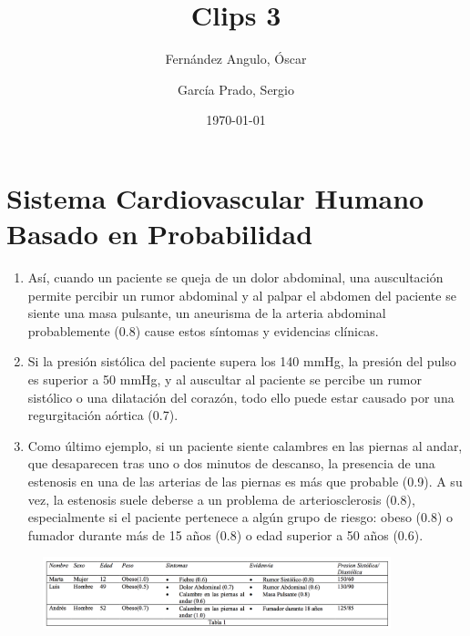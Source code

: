 \documentclass[10pt, a4paper,spanish]{article}
\title{\vspace{-15mm}\fontsize{24pt}{10pt}\selectfont\textbf{Clips 3}} %
\author{
	Fernández Angulo, Óscar \\
	\and
	García Prado, Sergio
}
\date{\today}
\begin{document}
	\maketitle %

	\thispagestyle{fancy} %



	\section{Sistema Cardiovascular Humano Basado en Probabilidad}

		\begin{enumerate}

			\item Así, cuando un paciente se queja de un dolor abdominal, una auscultación permite percibir un rumor abdominal y al palpar el abdomen del paciente se siente una masa pulsante, un aneurisma de la arteria abdominal probablemente (0.8) cause estos síntomas y evidencias clínicas.

			\item Si la presión sistólica del paciente supera los 140 mmHg, la presión del pulso es superior a 50 mmHg, y al auscultar al paciente se percibe un rumor sistólico o una dilatación del corazón, todo ello puede estar causado por una regurgitación aórtica (0.7).

			\item Como último ejemplo, si un paciente siente calambres en las piernas al andar, que desaparecen tras uno o dos minutos de descanso, la presencia de una estenosis en una de las arterias de las piernas es más que probable (0.9). A su vez, la estenosis suele deberse a un problema de arteriosclerosis (0.8), especialmente si el paciente pertenece a algún grupo de riesgo: obeso (0.8) o fumador durante más de 15 años (0.8) o edad superior a 50 años (0.6).

		\end{enumerate}

		\begin{figure}[H]
			\begin{center}
				\includegraphics[width=0.9\textwidth]{table-1}
			\end{center}
		\end{figure}
\end{document}
